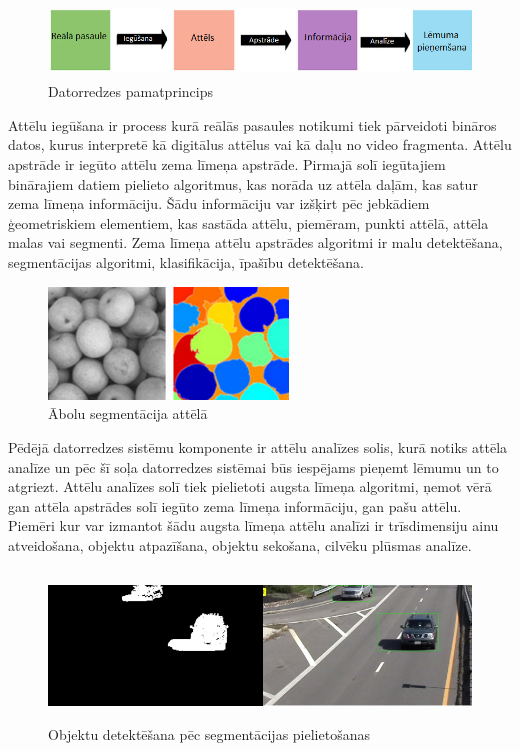 \begin{figure}[h]%
	\centering
	\includegraphics[height=2cm]{images/computervision1.png} %
	\caption{Datorredzes pamatprincips}%
	\label{fig:example}%
\end{figure}

Attēlu iegūšana ir process kurā reālās pasaules notikumi tiek pārveidoti bināros datos, kurus interpretē kā digitālus attēlus vai kā daļu no video fragmenta. Attēlu apstrāde ir iegūto attēlu zema līmeņa apstrāde. Pirmajā solī iegūtajiem binārajiem datiem pielieto algoritmus, kas norāda uz attēla daļām, kas satur zema līmeņa informāciju. Šādu informāciju var izšķirt pēc jebkādiem ģeometriskiem elementiem, kas sastāda attēlu, piemēram, punkti attēlā, attēla malas vai segmenti. Zema līmeņa attēlu apstrādes algoritmi ir malu detektēšana, segmentācijas algoritmi, klasifikācija, īpašību detektēšana.
\begin{figure}[h]%
	\centering
	\includegraphics[height=3cm]{images/computervision2.png} %
	\caption{Ābolu segmentācija attēlā \cite{compv1}}%
	\label{fig:example}%
\end{figure} 

Pēdējā datorredzes sistēmu komponente ir attēlu analīzes solis, kurā notiks attēla analīze un pēc šī soļa datorredzes sistēmai būs iespējams pieņemt lēmumu un to atgriezt. Attēlu analīzes solī tiek pielietoti augsta līmeņa algoritmi, ņemot vērā gan attēla apstrādes solī iegūto zema līmeņa informāciju, gan pašu attēlu. Piemēri kur var izmantot šādu augsta līmeņa attēlu analīzi ir trīsdimensiju ainu atveidošana, objektu atpazīšana, objektu sekošana, cilvēku plūsmas analīze.

\begin{figure}[H]%
	\centering
	\includegraphics[height=4cm]{images/computervision3.png} %
	\caption{Objektu detektēšana pēc segmentācijas pielietošanas \cite{compv2}}%
	\label{fig:example}%
\end{figure} 

